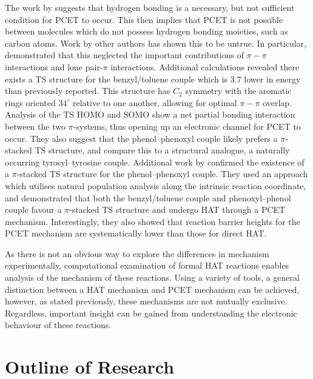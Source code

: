 The work by \citet{Mayer2002} suggests that hydrogen bonding is a necessary, but not sufficient condition for PCET to occur. This then implies that PCET is not possible between molecules which do not possess hydrogen bonding moieties, such as carbon atoms. Work by other authors has shown this to be untrue.\cite{Hatcher2007, DiLabio2007} In particular, \citet{DiLabio2007} demonstrated that this neglected the important contributions of $\pi-\pi$ interactions and lone pair-$\pi$ interactions. Additional calculations revealed there exists a TS structure for the benzyl/toluene couple which is 3.7 \kcalmol lower in energy than previously reported. This structure has $C_2$ symmetry with the aromatic rings oriented $34^\circ$ relative to one another, allowing for optimal $\pi-\pi$ overlap. Analysis of the TS HOMO and SOMO show a net partial bonding interaction between the two $\pi$-systems, thus opening up an electronic channel for PCET to occur. They also suggest that the phenol--phenoxyl couple likely prefers a $\pi$-stacked TS structure, and compare this to a structural analogue, a naturally occurring tyrosyl--tyrosine couple. Additional work by \citet{MunozRugeles2017} confirmed the existence of a $\pi$-stacked TS structure for the phenol--phenoxyl couple. They used an approach which utilises natural population analysis along the intrinsic reaction coordinate, and demonstrated that both the benzyl/toluene couple and phenoxyl--phenol couple favour a $\pi$-stacked TS structure and undergo HAT through a PCET mechanism. Interestingly, they also showed that reaction barrier heights for the PCET mechanism are systematically lower than those for direct HAT.

As there is not an obvious way to explore the differences in mechanism experimentally, computational examination of formal HAT reactions enables analysis of the mechanism of these reactions. Using a variety of tools, a general distinction between a HAT mechanism and PCET mechanism can be achieved, however, as stated previously, these mechanisms are not mutually exclusive. Regardless, important insight can be gained from understanding the electronic behaviour of these reactions.

\section{Outline of Research}

